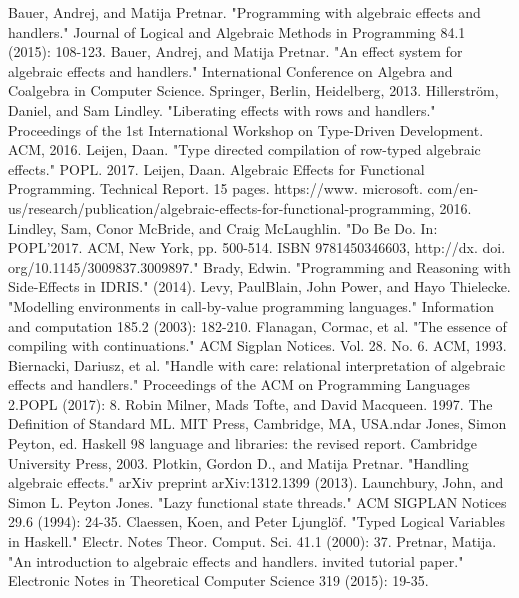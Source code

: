 \documentclass[12pt]{book}
\begin{document}
\newpage
\begin{thebibliography}{9}
Bauer, Andrej, and Matija Pretnar. "Programming with algebraic effects and handlers." Journal of Logical and Algebraic Methods in Programming 84.1 (2015): 108-123.
Bauer, Andrej, and Matija Pretnar. "An effect system for algebraic effects and handlers." International Conference on Algebra and Coalgebra in Computer Science. Springer, Berlin, Heidelberg, 2013.
Hillerstr\"{o}m, Daniel, and Sam Lindley. "Liberating effects with rows and handlers." Proceedings of the 1st International Workshop on Type-Driven Development. ACM, 2016.
Leijen, Daan. "Type directed compilation of row-typed algebraic effects." POPL. 2017.
Leijen, Daan. Algebraic Effects for Functional Programming. Technical Report. 15 pages. https://www. microsoft. com/en-us/research/publication/algebraic-effects-for-functional-programming, 2016.
Lindley, Sam, Conor McBride, and Craig McLaughlin. "Do Be Do. In: POPL'2017. ACM, New York, pp. 500-514. ISBN 9781450346603, http://dx. doi. org/10.1145/3009837.3009897."
Brady, Edwin. "Programming and Reasoning with Side-Effects in IDRIS." (2014).
Levy, PaulBlain, John Power, and Hayo Thielecke. "Modelling environments in call-by-value programming languages." Information and computation 185.2 (2003): 182-210.
Flanagan, Cormac, et al. "The essence of compiling with continuations." ACM Sigplan Notices. Vol. 28. No. 6. ACM, 1993.
Biernacki, Dariusz, et al. "Handle with care: relational interpretation of algebraic effects and handlers." Proceedings of the ACM on Programming Languages 2.POPL (2017): 8.
Robin Milner, Mads Tofte, and David Macqueen. 1997. The Definition of Standard ML. MIT Press, Cambridge, MA, USA.ndar
Jones, Simon Peyton, ed. Haskell 98 language and libraries: the revised report. Cambridge University Press, 2003.
Plotkin, Gordon D., and Matija Pretnar. "Handling algebraic effects." arXiv preprint arXiv:1312.1399 (2013).
Launchbury, John, and Simon L. Peyton Jones. "Lazy functional state threads." ACM SIGPLAN Notices 29.6 (1994): 24-35.
Claessen, Koen, and Peter Ljunglöf. "Typed Logical Variables in Haskell." Electr. Notes Theor. Comput. Sci. 41.1 (2000): 37.
Pretnar, Matija. "An introduction to algebraic effects and handlers. invited tutorial paper." Electronic Notes in Theoretical Computer Science 319 (2015): 19-35.
\end{thebibliography}
\end{document}
